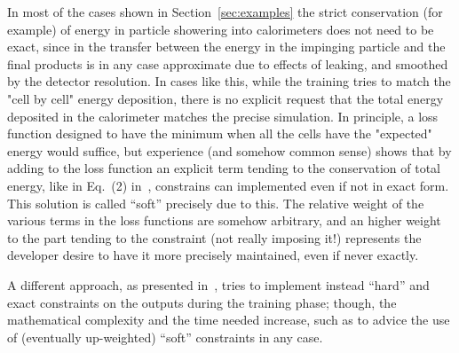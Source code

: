 In most of the cases shown in Section~\ref{sec:examples} the strict conservation (for example) of energy in particle showering into calorimeters does not need to be exact, since in the transfer  between the energy in the impinging particle and the final products is in any case approximate due to effects of leaking, and smoothed by the detector resolution. In cases like this, while the training tries to  match the "cell by cell" energy deposition, there is no explicit request that the total energy deposited in the calorimeter matches the precise simulation. In principle, a loss function designed to have the minimum when all the cells have the "expected" energy would suffice, but experience (and somehow common sense) shows that by adding to the loss function an explicit term tending to the conservation of total energy, like in Eq.~(2) in~\cite{Paganini2018}, constrains can implemented even if not in exact form. This solution is called ``soft'' precisely due to this.
The relative weight of the various terms in the loss functions are somehow arbitrary, and an higher weight to the part tending to the constraint (not really imposing it!) represents the developer desire to have it more precisely maintained, even if never exactly.

A different approach, as  presented in~\cite{Marquez-Neila2017}, tries to implement instead ``hard'' and exact constraints on the outputs during the training  phase; though, the mathematical complexity and the time needed increase, such as to advice the use of (eventually up-weighted)  ``soft'' constraints in any case.



